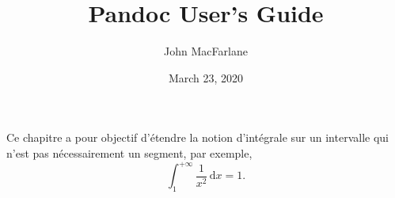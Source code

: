 \documentclass[]{article}
\title{Pandoc User's Guide}
\author{John MacFarlane}
\date{March 23, 2020}
\begin{document}
Ce chapitre a pour objectif d'étendre la notion d'intégrale sur un intervalle qui n'est pas nécessairement un
segment, par exemple, $$\int_{1 }^{+\infty } \frac{1}{x^2} \,\mathrm dx = 1.$$
\end{document}
